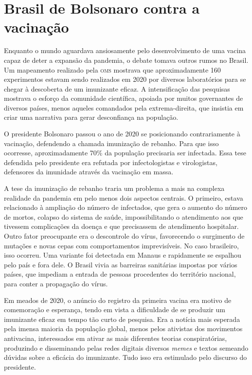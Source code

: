 \section{Brasil de Bolsonaro contra a vacinação}

Enquanto o mundo aguardava ansiosamente pelo desenvolvimento de uma
vacina capaz de deter a expansão da pandemia, o debate tomava outros
rumos no Brasil. Um mapeamento realizado pela \textsc{oms} mostrava que
aproximadamente 160 experimentos estavam sendo realizados em 2020 por
diversos laboratórios para se chegar à descoberta de um imunizante eficaz. 
A intensificação das pesquisas mostrava o esforço da
comunidade científica, apoiada por muitos governantes de diversos
países, menos aqueles comandados pela extrema-direita, que insistia em
criar uma narrativa para gerar desconfiança na população.

O presidente Bolsonaro passou o ano de 2020 se posicionando
contrariamente à vacinação, defendendo a chamada imunização de rebanho.
Para que isso ocorresse, aproximadamente 70\% da população precisaria
ser infectada. Essa tese defendida pelo presidente era refutada por
infectologistas e virologistas, defensores da imunidade através da
vacinação em massa.

A tese da imunização de rebanho traria um problema a mais na complexa
realidade da pandemia em pelo menos dois aspectos centrais. O primeiro,
estava relacionado à ampliação do número de infectados, que gera o
aumento do número de mortos, colapso do sistema de saúde,
impossibilitando o atendimento aos que tivessem complicações da doença e
que precisassem de atendimento hospitalar. Outro fator preocupante era o
descontrole do vírus, favorecendo o surgimento de mutações e novas cepas
com comportamentos imprevisíveis. No caso brasileiro, isso ocorreu. Uma
variante foi detectada em Manaus e rapidamente se espalhou pelo país e
fora dele. O Brasil vivia as barreiras sanitárias impostas por vários
países, que impediam a entrada de pessoas procedentes do território
nacional, para conter a propagação do vírus.

Em meados de 2020, o anúncio do registro da primeira vacina era motivo de
comemoração e esperança, tendo em vista a dificuldade de se produzir um
imunizante eficaz em tempo tão curto de pesquisa. Era a notícia mais
esperada pela imensa maioria da população global, menos pelos ativistas
dos movimentos antivacina, interessados em ativar as mais diferentes
teorias conspiratórias, produzindo e disseminando pelas redes digitais
diversos \textit{memes} e textos semeando dúvidas sobre a eficácia do imunizante.
Tudo isso era estimulado pelo discurso do presidente.


